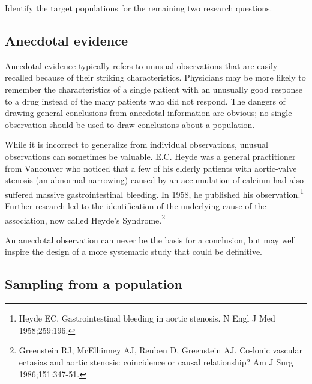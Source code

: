 \begin{exercisewrap}
\begin{nexercise}
Identify the target populations for the remaining two research questions.\footnotemark{}
\end{nexercise}
\end{exercisewrap}


\textD{\newpage}


\subsection{Anecdotal evidence}
\label{anecdotalEvidence}

Anecdotal evidence typically refers to unusual observations that are easily recalled because of their striking characteristics. Physicians may be more likely to remember the characteristics of a single patient with an unusually good response to a drug instead of the many patients who did not respond.  The dangers of drawing general conclusions from anecdotal information are obvious; no single observation should be used to draw conclusions about a population.

While it is incorrect to generalize from individual observations, unusual observations can sometimes be valuable.  E.C. Heyde was a general practitioner from Vancouver who noticed that a few of his elderly patients with aortic-valve stenosis (an abnormal narrowing) caused by an accumulation of calcium had also suffered massive gastrointestinal bleeding. In 1958, he published his observation.\footnote{Heyde EC. Gastrointestinal bleeding in aortic stenosis. N Engl J Med 1958;259:196.} Further research led to the identification of the underlying cause of the association, now called Heyde's Syndrome.\footnote{Greenstein RJ, McElhinney AJ, Reuben D, Greenstein AJ. Co-lonic vascular ectasias and aortic stenosis: coincidence or causal relationship? Am J Surg 1986;151:347-51.}

An anecdotal observation can never be the basis for a conclusion, but may well inspire the design of a more systematic study that could be definitive.  


\textD{\newpage}


\subsection{Sampling from a population}

